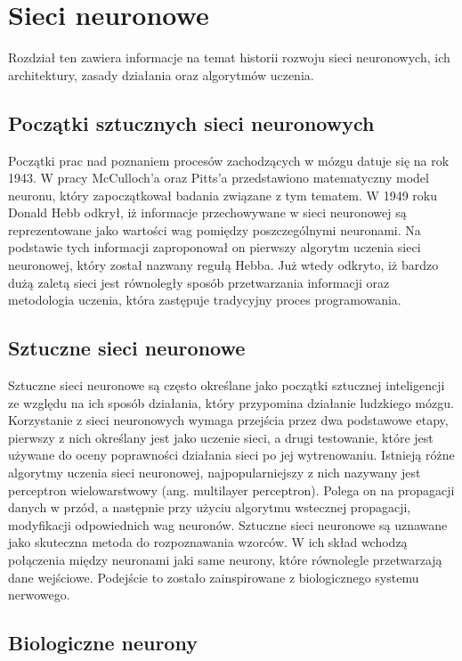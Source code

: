 \chapter{Sieci neuronowe}
\label{cha:sztuczne_sieci_neuronowe}

Rozdział ten zawiera informacje na temat historii rozwoju sieci neuronowych, ich architektury, zasady działania oraz algorytmów uczenia.

\section{Początki sztucznych sieci neuronowych}
Początki prac nad poznaniem procesów zachodzących w mózgu datuje się na rok 1943. W pracy McCulloch'a oraz Pitts'a przedstawiono matematyczny model neuronu, który zapoczątkował badania związane z tym tematem. W 1949 roku Donald Hebb odkrył, iż informacje przechowywane w sieci neuronowej są reprezentowane jako wartości wag pomiędzy poszczególnymi neuronami. Na podstawie tych informacji zaproponował on pierwszy algorytm uczenia sieci neuronowej, który został nazwany regułą Hebba. Już wtedy odkryto, iż bardzo dużą zaletą sieci jest równoległy sposób przetwarzania informacji oraz metodologia uczenia, która zastępuje tradycyjny proces programowania. 

\section{Sztuczne sieci neuronowe}
Sztuczne sieci neuronowe są często określane jako początki sztucznej inteligencji ze względu na ich sposób działania, który przypomina działanie ludzkiego mózgu. Korzystanie z sieci neuronowych wymaga przejścia przez dwa podstawowe etapy, pierwszy z nich określany jest jako uczenie sieci, a drugi testowanie, które jest używane do oceny poprawności działania sieci po jej wytrenowaniu. Istnieją różne algorytmy uczenia sieci neuronowej, najpopularniejszy z nich nazywany jest perceptron wielowarstwowy (ang. multilayer perceptron). Polega on na propagacji danych w przód, a następnie przy użyciu algorytmu wstecznej propagacji, modyfikacji odpowiednich wag neuronów. Sztuczne sieci neuronowe są uznawane jako skuteczna metoda do rozpoznawania wzorców. W ich skład wchodzą połączenia między neuronami jaki same neurony, które równolegle przetwarzają dane wejściowe. Podejście to zostało zainspirowane z biologicznego systemu nerwowego.

\section{Biologiczne neurony}

